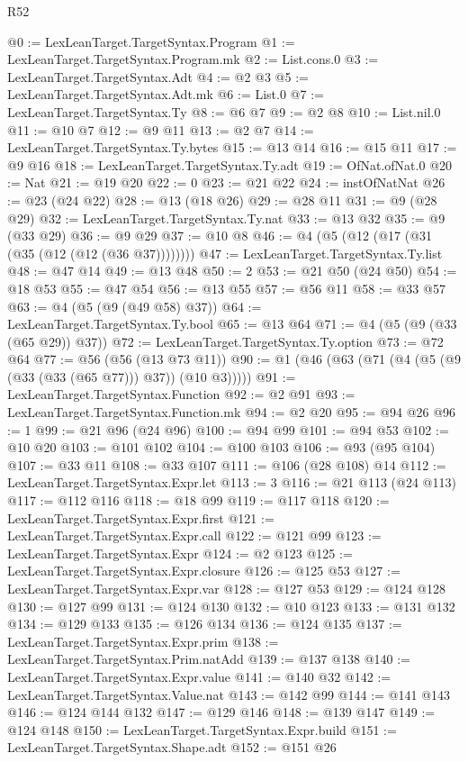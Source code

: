\begin{lexlean}{R52}
\begin{coremodule}
@0 := LexLeanTarget.TargetSyntax.Program
@1 := LexLeanTarget.TargetSyntax.Program.mk
@2 := List.cons.{0}
@3 := LexLeanTarget.TargetSyntax.Adt
@4 := @2 @3
@5 := LexLeanTarget.TargetSyntax.Adt.mk
@6 := List.{0}
@7 := LexLeanTarget.TargetSyntax.Ty
@8 := @6 @7
@9 := @2 @8
@10 := List.nil.{0}
@11 := @10 @7
@12 := @9 @11
@13 := @2 @7
@14 := LexLeanTarget.TargetSyntax.Ty.bytes
@15 := @13 @14
@16 := @15 @11
@17 := @9 @16
@18 := LexLeanTarget.TargetSyntax.Ty.adt
@19 := OfNat.ofNat.{0}
@20 := Nat
@21 := @19 @20
@22 := 0
@23 := @21 @22
@24 := instOfNatNat
@26 := @23 (@24 @22)
@28 := @13 (@18 @26)
@29 := @28 @11
@31 := @9 (@28 @29)
@32 := LexLeanTarget.TargetSyntax.Ty.nat
@33 := @13 @32
@35 := @9 (@33 @29)
@36 := @9 @29
@37 := @10 @8
@46 := @4 (@5 (@12 (@17 (@31 (@35 (@12 (@12 (@36 @37))))))))
@47 := LexLeanTarget.TargetSyntax.Ty.list
@48 := @47 @14
@49 := @13 @48
@50 := 2
@53 := @21 @50 (@24 @50)
@54 := @18 @53
@55 := @47 @54
@56 := @13 @55
@57 := @56 @11
@58 := @33 @57
@63 := @4 (@5 (@9 (@49 @58) @37))
@64 := LexLeanTarget.TargetSyntax.Ty.bool
@65 := @13 @64
@71 := @4 (@5 (@9 (@33 (@65 @29)) @37))
@72 := LexLeanTarget.TargetSyntax.Ty.option
@73 := @72 @64
@77 := @56 (@56 (@13 @73 @11))
@90 := @1 (@46 (@63 (@71 (@4 (@5 (@9 (@33 (@33 (@65 @77))) @37)) (@10 @3)))))
@91 := LexLeanTarget.TargetSyntax.Function
@92 := @2 @91
@93 := LexLeanTarget.TargetSyntax.Function.mk
@94 := @2 @20
@95 := @94 @26
@96 := 1
@99 := @21 @96 (@24 @96)
@100 := @94 @99
@101 := @94 @53
@102 := @10 @20
@103 := @101 @102
@104 := @100 @103
@106 := @93 (@95 @104)
@107 := @33 @11
@108 := @33 @107
@111 := @106 (@28 @108) @14
@112 := LexLeanTarget.TargetSyntax.Expr.let
@113 := 3
@116 := @21 @113 (@24 @113)
@117 := @112 @116
@118 := @18 @99
@119 := @117 @118
@120 := LexLeanTarget.TargetSyntax.Expr.first
@121 := LexLeanTarget.TargetSyntax.Expr.call
@122 := @121 @99
@123 := LexLeanTarget.TargetSyntax.Expr
@124 := @2 @123
@125 := LexLeanTarget.TargetSyntax.Expr.closure
@126 := @125 @53
@127 := LexLeanTarget.TargetSyntax.Expr.var
@128 := @127 @53
@129 := @124 @128
@130 := @127 @99
@131 := @124 @130
@132 := @10 @123
@133 := @131 @132
@134 := @129 @133
@135 := @126 @134
@136 := @124 @135
@137 := LexLeanTarget.TargetSyntax.Expr.prim
@138 := LexLeanTarget.TargetSyntax.Prim.natAdd
@139 := @137 @138
@140 := LexLeanTarget.TargetSyntax.Expr.value
@141 := @140 @32
@142 := LexLeanTarget.TargetSyntax.Value.nat
@143 := @142 @99
@144 := @141 @143
@146 := @124 @144 @132
@147 := @129 @146
@148 := @139 @147
@149 := @124 @148
@150 := LexLeanTarget.TargetSyntax.Expr.build
@151 := LexLeanTarget.TargetSyntax.Shape.adt
@152 := @151 @26

\end{coremodule}
\end{lexlean}
